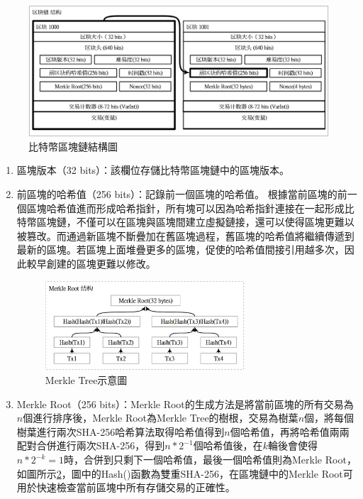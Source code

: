 			\begin{figure}[htbp]
				\centering
				\includegraphics[width = 1\textwidth]{blockchain.png}
				\caption{比特幣區塊鏈結構圖}\label{blockchain}
			\end{figure}

				\begin{enumerate}
				\item 區塊版本（32 bits）：該欄位存儲比特幣區塊鏈中的區塊版本。
				\item 前區塊的哈希值（256 bits）：記錄前一個區塊的哈希值。 根據當前區塊的前一個區塊哈希值進而形成哈希指針，所有塊可以因為哈希指針連接在一起形成比特幣區塊鏈，不僅可以在區塊與區塊間建立虛擬鏈接，還可以使得區塊更難以被篡改。而通過新區塊不斷疊加在舊區塊過程，舊區塊的哈希值將繼續傳遞到最新的區塊。若區塊上面堆疊更多的區塊，促使的哈希值間接引用越多次，因此較早創建的區塊更難以修改。

				\begin{figure}[htbp]
					\centering
					\includegraphics[width = 0.7\textwidth]{MerkleRoot.png}
					\caption{Merkle Tree示意圖}\label{MerkleRoot}
				\end{figure}

				\item Merkle Root（256 bits）：Merkle Root的生成方法是將當前區塊的所有交易為$n$個進行排序後，Merkle Root為Merkle Tree的樹根，交易為樹葉$n$個，將每個樹葉進行兩次SHA-256哈希算法取得哈希值得到$n$個哈希值，再將哈希值兩兩配對合併進行兩次SHA-256，得到$n*2^{-1}$個哈希值後，在$k$輪後會使得$n*2^{-k}=1$時，合併到只剩下一個哈希值，最後一個哈希值則為Merkle Root，如圖所示\ref{MerkleRoot}，圖中的Hash()函數為雙重SHA-256，在區塊鏈中的Merkle Root可用於快速檢查當前區塊中所有存儲交易的正確性。


\end{enumerate}
